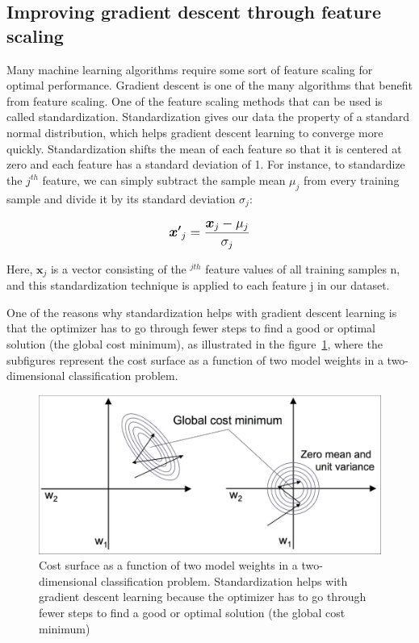 \documentclass[11pt]{article}
\newcommand{\vect}[1]{\boldsymbol{#1}}
\begin{document}
    \subsection{Improving gradient descent through feature scaling} \label{subsec:grad_desc_norm}

    Many machine learning algorithms require some sort of feature scaling for optimal performance.
    Gradient descent is one of the many algorithms that benefit from feature scaling.
    One of the feature scaling methods that can be used is called standardization.
    Standardization gives our data the property of a standard normal distribution, which helps gradient descent learning to converge more quickly.
    Standardization shifts the mean of each feature so that it is centered at zero and each feature has a standard deviation of 1.
    For instance, to standardize the $j^{th}$ feature, we can simply subtract the sample mean $\mu_j$ from every training sample and divide it by its standard deviation $\sigma_j$:

    \begin{equation}
        \label{eq:standardization}
        \large{ \vect{x'}_j = \frac{\vect{x}_j - \mu_j} {\sigma_j} }
    \end{equation}


    Here, $\vect{x}_j$ is a vector consisting of the $^{jth}$ feature values of all training samples n, and this standardization technique is applied to each feature j in our dataset.

    One of the reasons why standardization helps with gradient descent learning is that the optimizer has to go through fewer steps to find a good or optimal solution (the global cost minimum), as illustrated in the figure~\ref{fig:standardization}, where the subfigures represent the cost surface as a function of two model weights in a two-dimensional classification problem.

    \begin{figure}[hbt!]
        \centering
        \includegraphics[width=1\linewidth,trim=4 4 4 4,clip]{img/standardization.jpg}
        \caption{Cost surface as a function of two model weights in a two-dimensional classification problem.
        Standardization helps with gradient descent learning because the optimizer has to go through fewer steps to find a good or optimal solution (the global cost minimum)}
        \label{fig:standardization}
    \end{figure}
\end{document}
